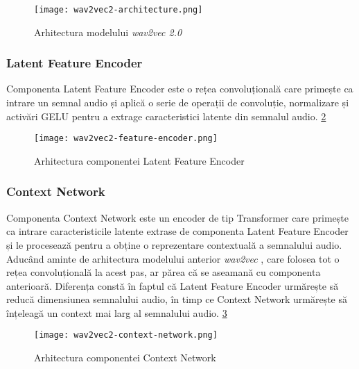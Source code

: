\begin{figure}[h]
    \centering
    \texttt{[image: wav2vec2-architecture.png]}
    \caption{Arhitectura modelului \textit{wav2vec 2.0} \protect\footnotemark[1]}
    \label{fig:wav2vec2-architecture}
\end{figure}

\subsubsection{Latent Feature Encoder}
\vspace{2em}
Componenta Latent Feature Encoder este o rețea convoluțională care primește ca 
intrare un semnal audio și aplică o serie de operații de convoluție, normalizare
și activări GELU pentru a extrage caracteristici latente din semnalul audio.
\ref{fig:latent-feature-encoder}

\vspace{3em}

\begin{figure}[h]
    \centering
    \texttt{[image: wav2vec2-feature-encoder.png]}
    \caption{Arhitectura componentei Latent Feature Encoder \protect\footnotemark[1]}
    \label{fig:latent-feature-encoder}
\end{figure}


\vspace{3em}

\subsubsection{Context Network}
\vspace{1em}
Componenta Context Network este un encoder de tip Transformer care primește ca
intrare caracteristicile latente extrase de componenta Latent Feature Encoder și
le procesează pentru a obține o reprezentare contextuală a semnalului audio. Aducând
aminte de arhitectura modelului anterior \textit{wav2vec} \cite{wav2vec}, care folosea
tot o rețea convoluțională la acest pas, ar părea că se aseamană cu componenta anterioară.
Diferența constă în faptul că Latent Feature Encoder urmărește să reducă dimensiunea 
semnalului audio, în timp ce Context Network urmărește să înțeleagă un context mai larg
al semnalului audio. \ref{fig:wav2vec2-context-network}

\begin{figure}[h]
    \centering
    \texttt{[image: wav2vec2-context-network.png]}
    \caption{Arhitectura componentei Context Network \protect\footnotemark[1]}
    \label{fig:wav2vec2-context-network}
\end{figure}

